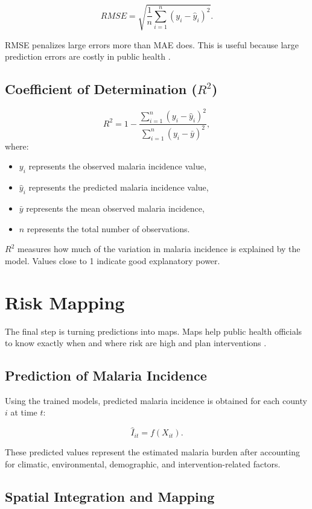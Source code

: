 	\[
	RMSE = \sqrt{\frac{1}{n} \sum_{i=1}^{n} (y_i - \hat{y}_i)^2}.
	\]
	
	RMSE penalizes large errors more than MAE does. This is useful because large prediction errors are costly in public health \cite{Ly2025Forecasting}.
	
	\subsection{Coefficient of Determination (\(R^2\))}
	
	\[
	R^2 = 1 - \frac{\sum_{i=1}^{n} (y_i - \hat{y}_i)^2}{\sum_{i=1}^{n} (y_i - \bar{y})^2},
	\]
	where:
	\begin{itemize}
		\item $y_i$ represents the observed malaria incidence value,
		\item $\hat{y}_i$ represents the predicted malaria incidence value,
		\item $\bar{y}$ represents the mean observed malaria incidence,
		\item $n$ represents the total number of observations.
	\end{itemize}
	\(R^2\) measures how much of the variation in malaria incidence is explained by the model. Values close to 1 indicate good explanatory power.
	
	\section{Risk Mapping}
	\label{sec:risk_mapping}
	
	
	
	The final step is turning predictions into maps. Maps help public health officials  to know exactly when and where risk are high and plan interventions \cite{amek2012spatial}.
	\subsection{Prediction of Malaria Incidence}
	
	Using the trained models, predicted malaria incidence is obtained for each county $i$ at time $t$:
	
	\[
	\hat{I}_{it} = f(X_{it}).
	\]
	
	These predicted values represent the estimated malaria burden after accounting for climatic, environmental, demographic, and intervention-related factors.
	\subsection{Spatial Integration and Mapping}
	\label{sec:spatial_mapping}
	
